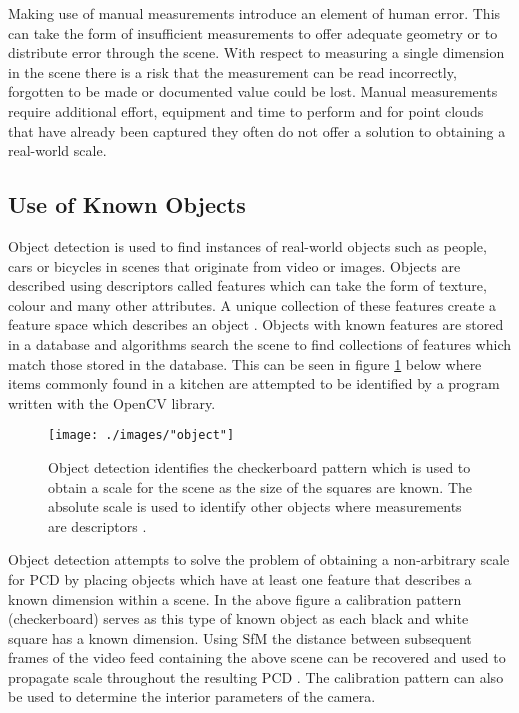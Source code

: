 Making use of manual measurements introduce an element of human error. This can take the form of insufficient measurements to offer adequate geometry or to distribute error through the scene. With respect to measuring a single dimension in the scene there is a risk that the measurement can be read incorrectly, forgotten to be made or documented value could be lost. Manual measurements require additional effort, equipment and time to perform and for point clouds that have already been captured they often do not offer a solution to obtaining a real-world scale.
\vspace{-5mm}
\subsection{Use of Known Objects \label{ObjectDetection}}
\vspace{-5mm}
Object detection is used to find instances of real-world objects such as people, cars or bicycles in scenes that originate from video or images. Objects are described using descriptors called features which can take the form of texture, colour and many other attributes. A unique collection of these features create a feature space which describes an object \citep{davidson-pilon_machine_2012}. Objects with known features are stored in a database and algorithms search the scene to find collections of features which match those stored in the database. This can be seen in figure \ref{objectdetec} below where items commonly found in a kitchen are attempted to be identified by a program written with the OpenCV library. 
\vspace{-1mm}
\begin{figure}[h!]
	\centering
	\texttt{[image: ./images/"object"]}
	\caption[Object Detection using OpenCV]{Object detection identifies the checkerboard pattern which is used to obtain a scale for the scene as the size of the squares are known. The absolute scale is used to identify other objects where measurements are descriptors \citep{opencv_devzone_opencv_2011}.
	\label{objectdetec}}
\end{figure}
\clearpage
Object detection attempts to solve the problem of obtaining a non-arbitrary scale for PCD by placing objects which have at least one feature that describes a known dimension within a scene. In the above figure a calibration pattern (checkerboard) serves as this type of known object as each black and white square has a known dimension. Using SfM the distance between subsequent frames of the video feed containing the above scene can be recovered and used to propagate scale throughout the resulting PCD \citep{fleet_computer_2014}. The calibration pattern can also be used to determine the interior parameters of the camera. 

